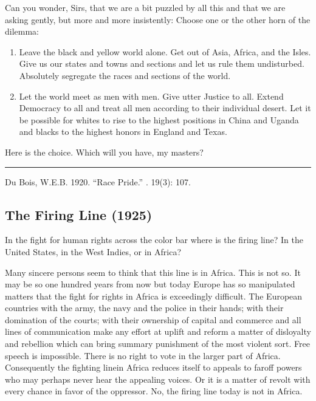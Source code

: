 \documentclass[letterpaper,10pt,english]{jupyterBook}
\begin{document}
\sphinxAtStartPar
Can you wonder, Sirs, that we are a bit puzzled by all this and that we are asking gently, but more and more insistently: Choose one or the other horn of the dilemma:
\begin{enumerate}
%
\item {} 
\sphinxAtStartPar
Leave the black and yellow world alone. Get out of Asia, Africa, and the Isles. Give us our states and towns and sections and let us rule them undisturbed. Absolutely segregate the races and sections of the world.

\item {} 
\sphinxAtStartPar
Let the world meet as men with men. Give utter Justice to all. Extend Democracy to all and treat all men according to their individual desert. Let it be possible for whites to rise to the highest positions in China and Uganda and blacks to the highest honors in England and Texas.

\end{enumerate}

\sphinxAtStartPar
Here is the choice. Which will you have, my masters?


\bigskip\hrule\bigskip


\sphinxAtStartPar
{} Du Bois, W.E.B. 1920. “Race Pride.” . 19(3): 107.


\subsection{The Firing Line (1925)}
\label{\detokenize{Volumes/31/02/firing_line:the-firing-line-1925}}\label{\detokenize{Volumes/31/02/firing_line::doc}}
\sphinxAtStartPar
In the fight for human rights across the color bar where is the firing line? In the United States, in the West Indies, or in Africa?

\sphinxAtStartPar
Many sincere persons seem to think that this line is in Africa. This is not so. It may be so one hundred years from now but today Europe has so manipulated matters that the fight for rights in Africa is exceedingly difficult. The European countries with the army, the navy and the police in their hands; with their domination of the courts; with their ownership of capital and commerce and all lines of communication make any effort at uplift and reform a matter of disloyalty and rebellion which can bring summary punishment of the most violent sort. Free speech is impossible. There is no right to vote in the larger part of Africa. Consequently the fighting line\sphinxhyphen{}in Africa reduces itself to appeals to far\sphinxhyphen{}off powers who may perhaps never hear the appealing voices. Or it is a matter of revolt with every chance in favor of the oppressor. No, the firing line today is not in Africa.
\end{document}
